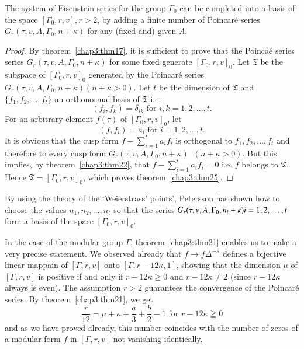 \begin{thm} \label{chap3:thm24}
The system of Eisenstein series for the group $\Gamma_0$ can be
completed into a basis of the space $[\Gamma_0, r, v], r>2$, by
adding a finite number of Poincar\'e series $G_r(\tau,v,A,\Gamma_0,
n+\kappa)$ for any (fixed and) given $A$. 
\end{thm}

\begin{proof}
By theorem~\ref{chap3:thm17}, it is sufficient to prove that the Poinca\'e series
series $G_r(\tau,v,A,\Gamma_0,n+\kappa)$ for some fixed generate
$[\Gamma_0,r,v]_0$. Let $\mathfrak{T}$ be the subspace of
$[\Gamma_0,r,v]_0$ generated by the Poincar\'e series
$G_r(\tau,v,A,\Gamma_0, n+\kappa)(n+\kappa>0)$. Let $t$ be the
dimension of $\mathfrak{T}$ and $\{f_1,f_2,\ldots, f_t\}$ an
orthonormal basis of $\mathfrak{T}$ i.e.
$$
(f_i,f_k) = \delta_{ik} \text{ for } i,k=1,2,\ldots, t. 
$$
For an arbitrary element $f(\tau)$ of $[\Gamma_0,r,v]_0$, let
$$(f,f_i)=a_i \mbox{ for } i=1,2,\ldots,t.$$ 
It is obvious that the cusp form
$f-\sum\limits^{t}_{i=1}a_if_i$ is orthogonal to \pageoriginale
$f_1,f_2,\ldots, f_t$ and therefore to every cusp form
$G_r(\tau,v,A,\Gamma_0, n+\kappa) \;\; (n+\kappa>0)$. But this implies, by
theorem~\ref{chap3:thm22}, that $f-\sum\limits^t_{i=1}a_if_i=0$ i.e. $f$ belongs to
$\mathfrak{T}$. Hence $\mathfrak{T}=[\Gamma_0,r,v]_0$, which proves
theorem~\ref{chap3:thm25}.
\end{proof}

By using the theory of the `Weierstrass' points', Petersson has shown
how to choose the values $n_1,n_2,\ldots,n_t$ so that the series
$G_r(\tau, v,A,\Gamma_0,n_i\break+\kappa) i=1,2,\ldots, t$ form a basis of
the space $[\Gamma_0,r,v]_0$.

In the case of the modular group $\Gamma$, theorem~\ref{chap3:thm21} enables us to
make a very precise statement. We observed already that $f\to
f\Delta^{-\kappa}$  defines a bijective linear mappain of
$[\Gamma,r,v]$ onto $[\Gamma, r-12\kappa, 1]$, showing that the
dimension $\mu$ of $[\Gamma, r,v]$ is positive if and only if
$r-12\kappa \geq 0$ and $r-12\kappa \neq 2$ (since $r-12\kappa$ always
is even). The assumption $r>2$ guarantees the convergence of the
Poincar\'e series. By theorem~\ref{chap3:thm21}, we get 
$$
\frac{r}{12} = \mu + \kappa + \frac{a}{3} + \frac{b}{2} -1\text{ for }
r - 12 \kappa \geqq 0
$$
and as we have proved already, this number coincides with the number
of zeros of a modular form $f$ in $[\Gamma,r, v]$ not vanishing
identically.


